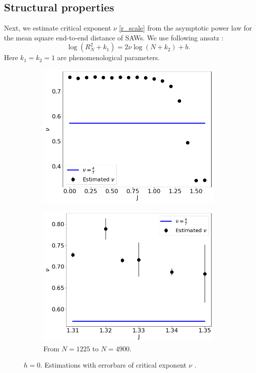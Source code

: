 \subsection{Structural properties}
\label{structureprocedure}
Next, we estimate critical exponent $\nu$ \eqref{r_scale} from the asymptotic power law for the mean square end-to-end distance of SAWs. We use following ansatz  \cite{Berretti1985}:
\begin{equation}
\label{berettiscale}
\log (R_N^2+k_1 ) = 2 \nu \log (N+k_2) + b.
\end{equation}
Here $k_1=k_2=1$ are phenomenological parameters. 
 \begin{figure}[H]
 	\centering
 	\captionsetup{justification=centering}
\begin{subfigure}[b]{0.45\textwidth}
	\includegraphics[scale=0.36]{Images/nu_shortchains.png}
	\label{fig:nushort_left}
\end{subfigure}
	\begin{subfigure}[b]{0.45\textwidth}
	\includegraphics[scale=0.36]{Images/nu_shortchains_1.png}
		\caption{ From $N=1225$ to $N=4900$. }
	\label{fig:nushort_right}
\end{subfigure}
	\caption{$h=0$. Estimations with errorbars of critical exponent $\nu$ .   }
	\label{fig:nushort}
\end{figure}
 

